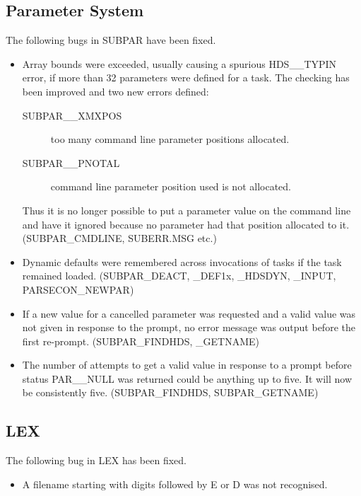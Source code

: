 \subsection{Parameter System}
The following bugs in SUBPAR have been fixed.
\begin{itemize}
\item Array bounds were exceeded, usually causing a spurious HDS\_\_TYPIN
error, if more than 32 parameters were defined for a task.
The checking has been improved and two new errors defined:
\begin{description}
\item[SUBPAR\_\_XMXPOS] too many command line parameter positions allocated.
\item[SUBPAR\_\_PNOTAL] command line parameter position used is not allocated.
\end{description}
Thus it is no longer possible to put a parameter value on the command line and
have it ignored because no parameter had that position allocated to it.
(SUBPAR\_CMDLINE, SUBERR.MSG etc.)
\item Dynamic defaults were remembered across invocations of tasks if the
task remained loaded. (SUBPAR\_DEACT, \_DEF1x, \_HDSDYN, \_INPUT, 
PARSECON\_NEWPAR)
\item If a new value for a cancelled parameter was requested and a valid value
was not given in response to the prompt, no error message was output before
the first re-prompt. (SUBPAR\_FINDHDS, \_GETNAME)
\item The number of attempts to get a valid value in response to a prompt
before status PAR\_\_NULL was returned could be anything up to five.
It will now be consistently five. (SUBPAR\_FINDHDS, SUBPAR\_GETNAME)
\end{itemize}

\subsection{LEX}
The following bug in LEX has been fixed.
\begin{itemize}
\item A filename starting with digits followed by E or D was not recognised.
\end{itemize}

